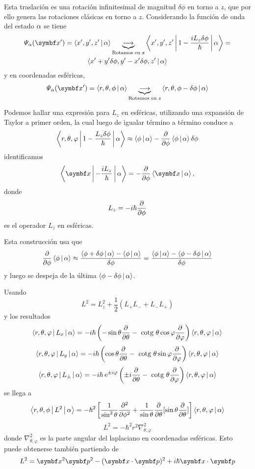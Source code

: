 \documentclass[10pt,oneside]{CBFT_book}
\begin{document}
Esta traslación es una rotación infinitesimal de magnitud $\delta\phi$ en torno a $z$, que por ello
genera las rotaciones clásicas en torno a $z$.
Considerando la función de onda del estado $\a$ se tiene
\begin{multline*}
	\Psi_\alpha(\vb{x}') = \Braket{x',y',z'|\alpha} \underbrace{\longrightarrow}_{\text{Rotamos en z}}
	\Braket{x',y',z'|1-\frac{iL_z\delta\phi}{\hbar}|\alpha} = \\
	\Braket{x'+y'\delta\phi,y'-x'\delta\phi,z'|\alpha}
\end{multline*}
y en coordenadas esféricas,
\[
	\Psi_\alpha(\vb{x}') = \Braket{r,\theta,\phi|\alpha} 
	\underbrace{\longrightarrow}_{\text{Rotamos en z}} \Braket{r,\theta,\phi-\delta\phi|\alpha}
\]

Podemos hallar una expresión para $L_z$ en esféricas, utilizando una expansión de Taylor
a primer orden, la cual luego de igualar término a término conduce a
\[
	\Braket{r,\theta,\varphi|1-\frac{L_z\delta\phi}{\hbar}|\alpha} \approx
	\Braket{\phi|\alpha} -\dpar{}{\phi}\Braket{\phi|\alpha}\delta\phi
\]
identificamos 
\[
	\Braket{\vb{x}|-\frac{iL_z}{\hbar}|\alpha} = -\dpar{}{\phi}\Braket{\vb{x}|\alpha},
\]
donde 
\[
	L_z =  -i\hbar\dpar{}{\phi}
\]
es el operador $L_z$ en esféricas.

Esta construcción usa que 
\[
	\dpar{}{\phi} \Braket{\phi|\alpha} \approx 
	\frac{\Braket{\phi+\delta\phi|\alpha}-\Braket{\phi|\alpha}}{\delta\phi} =
	\frac{\Braket{\phi|\alpha} -\Braket{\phi-\delta\phi|\alpha}}{\delta\phi}
\]
y luego se despeja de la última $\Braket{\phi-\delta\phi|\alpha}$.

Usando 
\[
	L^2 = L_z^2 + \frac{1}{2}\left( L_+L_- + L_-L_+ \right)
\]
y los resultados
\[
	\Braket{r,\theta,\vp|L_x|\a} = 
	- i \hbar \left( -\sin\theta\dpar{}{\theta} - \cotg\theta\cos\vp\dpar{}{\vp} \right) 
	\Braket{r,\theta,\vp|\a}
\]
\[
	\Braket{r,\theta,\vp|L_y|\a} = 
	- i \hbar \left( \cos\theta\dpar{}{\theta} - \cotg\theta\sin\vp\dpar{}{\vp} \right) 
	\Braket{r,\theta,\vp|\a}
\]
\[
	\Braket{r,\theta,\vp|L_\pm|\a} = 
	- i \hbar \euler^{ \pm i \vp } \left( \pm i \dpar{}{\theta} - \cotg\theta\dpar{}{\vp} \right) 
	\Braket{r,\theta,\vp|\a}	
\]
se llega a 
\[
	\Braket{r,\theta,\phi|L^2|\alpha} = -\hbar^2\left[ \frac{1}{\sin^2 \theta}\dpar[2]{}{\phi} +
	\frac{1}{\sin \theta} \dpar{}{\theta}[\sin\theta\dpar{}{\theta} ]\right]
	\Braket{r,\theta,\varphi|\alpha}
\]
\[
	L^2 = -\hbar^2 r^2 \nabla^2_{\theta,\varphi}
\]
donde $\nabla^2_{\theta,\varphi}$ es la parte angular del laplaciano en coordenadas esféricas.
Esto puede obtenerse también partiendo de 
\[
	L^2 = \vb{x}^2\vb{p}^2 - (\vb{x}\cdot\vb{p})^2 + i\hbar \vb{x}\cdot\vb{p}
\]
\end{document}
